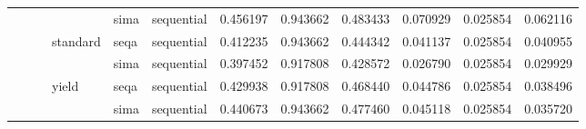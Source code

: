\begin{tabular}{llllllrrrrrr}
    &     &         &       & sima & sequential &  0.456197 &  0.943662 &  0.483433 &  0.070929 &  0.025854 &  0.062116 \\
    &     &         & standard & seqa & sequential &  0.412235 &  0.943662 &  0.444342 &  0.041137 &  0.025854 &  0.040955 \\
    &     &         &       & sima & sequential &  0.397452 &  0.917808 &  0.428572 &  0.026790 &  0.025854 &  0.029929 \\
    &     &         & yield & seqa & sequential &  0.429938 &  0.917808 &  0.468440 &  0.044786 &  0.025854 &  0.038496 \\
    &     &         &       & sima & sequential &  0.440673 &  0.943662 &  0.477460 &  0.045118 &  0.025854 &  0.035720 \\
\bottomrule
\end{tabular}
